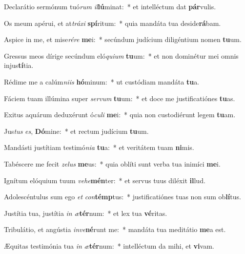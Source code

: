 \item Declarátio sermónum tuó\textit{rum} \textit{il}\textbf{lú}minat:~* et intelléctum dat \textbf{pár}vulis.
\item Os meum apérui, et at\textit{trá}\textit{xi} \textbf{spí}ritum:~* quia mandáta tua deside\textbf{rá}bam.
\item Aspice in me, et mise\textit{ré}\textit{re} \textbf{me}i:~* secúndum judícium diligéntium nomen \textbf{tu}um.
\item Gressus meos dírige secúndum eló\textit{qui}\textit{um} \textbf{tu}um:~* et non dominétur mei omnis injus\textbf{tí}tia.
\item Rédime me a calúm\textit{ni}\textit{is} \textbf{hó}minum:~* ut custódiam mandáta \textbf{tu}a.
\item Fáciem tuam illúmina super \textit{ser}\textit{vum} \textbf{tu}um:~* et doce me justificatiónes \textbf{tu}as.
\item Exitus aquárum deduxérunt ó\textit{cu}\textit{li} \textbf{me}i:~* quia non custodiérunt legem \textbf{tu}am.
\item Jus\textit{tus} \textit{es}, \textbf{Dó}mine:~* et rectum judícium \textbf{tu}um.
\item Mandásti justítiam testimó\textit{ni}\textit{a} \textbf{tu}a:~* et veritátem tuam \textbf{ni}mis.
\item Tabéscere me fecit \textit{ze}\textit{lus} \textbf{me}us:~* quia oblíti sunt verba tua inimíci \textbf{me}i.
\item Ignítum elóquium tuum \textit{ve}\textit{he}\textbf{mén}ter:~* et servus tuus diléxit \textbf{il}lud.
\item Adolescéntulus sum ego \textit{et} \textit{con}\textbf{témp}tus:~* justificatiónes tuas non sum ob\textbf{lí}tus.
\item Justítia tua, justítia \textit{in} \textit{æ}\textbf{tér}num:~* et lex tua \textbf{vé}ritas.
\item Tribulátio, et angústia \textit{in}\textit{ve}\textbf{né}runt me:~* mandáta tua meditátio \textbf{me}a est.
\item Æquitas testimónia tua \textit{in} \textit{æ}\textbf{tér}num:~* intelléctum da mihi, et \textbf{vi}vam.
